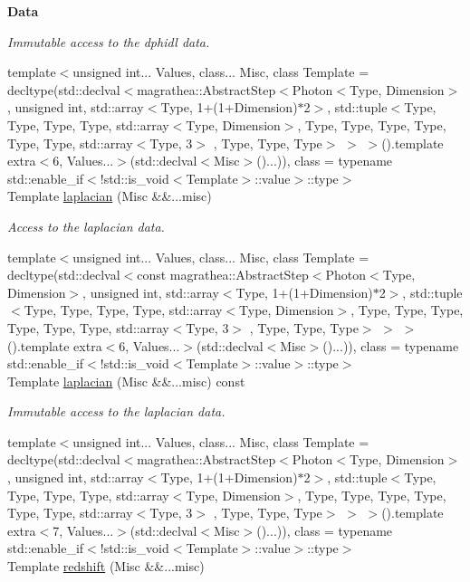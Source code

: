 \begin{Indent}{\bf Data}
\begin{DoxyCompactItemize}
\begin{DoxyCompactList}\small\item\em Immutable access to the dphidl data. \end{DoxyCompactList}\item 
{\footnotesize template$<$unsigned int... Values, class... Misc, class Template  = decltype(std\-::declval$<$magrathea\-::\-Abstract\-Step$<$\-Photon$<$\-Type, Dimension$>$, unsigned int, std\-::array$<$\-Type, 1+(1+\-Dimension)$\ast$2$>$, std\-::tuple$<$\-Type, Type, Type, Type, std\-::array$<$\-Type, Dimension$>$, Type, Type, Type, Type, Type, Type, std\-::array$<$\-Type, 3$>$ , Type, Type, Type$>$ $>$ $>$().\-template extra$<$6, Values...$>$(std\-::declval$<$\-Misc$>$()...)), class  = typename std\-::enable\-\_\-if$<$!std\-::is\-\_\-void$<$\-Template$>$\-::value$>$\-::type$>$ }\\Template \hyperlink{exceptionPhoton_a37b3bb9eeb61938822859923f52a5f33}{laplacian} (Misc \&\&...misc)
\begin{DoxyCompactList}\small\item\em Access to the laplacian data. \end{DoxyCompactList}\item 
{\footnotesize template$<$unsigned int... Values, class... Misc, class Template  = decltype(std\-::declval$<$const magrathea\-::\-Abstract\-Step$<$\-Photon$<$\-Type, Dimension$>$, unsigned int, std\-::array$<$\-Type, 1+(1+\-Dimension)$\ast$2$>$, std\-::tuple$<$\-Type, Type, Type, Type, std\-::array$<$\-Type, Dimension$>$, Type, Type, Type, Type, Type, Type, std\-::array$<$\-Type, 3$>$ , Type, Type, Type$>$ $>$ $>$().\-template extra$<$6, Values...$>$(std\-::declval$<$\-Misc$>$()...)), class  = typename std\-::enable\-\_\-if$<$!std\-::is\-\_\-void$<$\-Template$>$\-::value$>$\-::type$>$ }\\Template \hyperlink{exceptionPhoton_a2ce5901d0c4fa6c3f160acd257bd455d}{laplacian} (Misc \&\&...misc) const 
\begin{DoxyCompactList}\small\item\em Immutable access to the laplacian data. \end{DoxyCompactList}\item 
{\footnotesize template$<$unsigned int... Values, class... Misc, class Template  = decltype(std\-::declval$<$magrathea\-::\-Abstract\-Step$<$\-Photon$<$\-Type, Dimension$>$, unsigned int, std\-::array$<$\-Type, 1+(1+\-Dimension)$\ast$2$>$, std\-::tuple$<$\-Type, Type, Type, Type, std\-::array$<$\-Type, Dimension$>$, Type, Type, Type, Type, Type, Type, std\-::array$<$\-Type, 3$>$ , Type, Type, Type$>$ $>$ $>$().\-template extra$<$7, Values...$>$(std\-::declval$<$\-Misc$>$()...)), class  = typename std\-::enable\-\_\-if$<$!std\-::is\-\_\-void$<$\-Template$>$\-::value$>$\-::type$>$ }\\Template \hyperlink{exceptionPhoton_accb497bd5b41da8087e2dab35d60de48}{redshift} (Misc \&\&...misc)

\end{DoxyCompactItemize}
\end{Indent}
